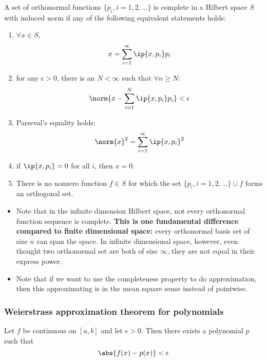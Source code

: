 \begin{refsection}
\begin{theorem}
	\cite[187]{moon2000mathematical}\cite[109-111]{debnath2005hilbert}A set of orthonormal functions $\{p_i,i=1,2,...\}$ is complete in a Hilbert space $S$ with induced norm if any of the following equivalent statements holds:
	\begin{enumerate}
		\item $\forall x\in S$,
		$$x=\sum_{i=1}^\infty \ip{x,p_i}p_i$$
		\item for any $\epsilon > 0$, there is an $N < \infty$ such that $\forall n \geq N$:
		$$\norm{x-\sum_{i=1}^N\ip{x,p_i}p_i} < \epsilon$$
		\item Parseval's equality holds: $$\norm{x}^2=\sum_{i=1}^\infty \ip{x,p_i}^2$$
		\item if $\ip{x,p_i} = 0$ for all $i$, then $x=0$.
		\item There is no nonzero function $f\in S$ for which the set $\{p_i,i=1,2,...\}\cup f$ forms an orthogonal set.
	\end{enumerate}
\end{theorem}


\begin{remark}\hfill
	\begin{itemize}
		\item Note that in the infinite dimension Hilbert space, not every orthonormal function sequence is complete. \textbf{This is one fundamental difference compared to finite dimensional space:} every orthonormal basis set of size $n$ can span the space. In infinite dimensional space, however, even thought two orthonormal set are both of size $\infty$, they are not equal in their express power. 
		\item Note that if we want to use the completeness property to do approximation, then this approximating is in the mean square sense instead of pointwise.
	\end{itemize}
\end{remark}










\subsubsection{Weierstrass approximation theorem for polynomials}
\begin{theorem}\cite[321]{johnsonbaugh2010foundations}
	Let $f$ be continuous on $[a,b]$ and let $\epsilon > 0$. Then there exists a polynomial $p$ such that 
	$$\abs{f(x)-p(x)} < \epsilon$$
\end{theorem}


\end{refsection}
